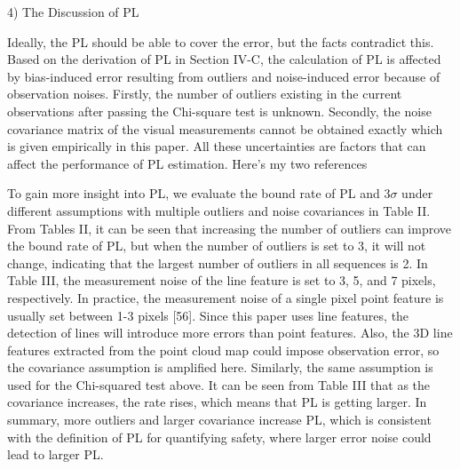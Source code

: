\documentclass[10pt, letterpaper]{article}
\begin{document}
\begin{multicols*}{2}
4) The Discussion of PL


Ideally, the PL should be able to cover the error, but the facts
contradict this. Based on the derivation of PL in Section IV-C,
the calculation of PL is affected by bias-induced error resulting
from outliers and noise-induced error because of observation
noises. Firstly, the number of outliers existing in the current
observations after passing the Chi-square test is unknown.
Secondly, the noise covariance matrix of the visual
measurements cannot be obtained exactly which is given
empirically in this paper. All these uncertainties are factors that
can affect the performance of PL estimation.
\color{blue}Here's my two references \cite{pouliot2009linescout}\cite{zelazo2012rigidity}\color{black}

To gain more insight into PL, we evaluate the bound rate of
PL and 3$\sigma$ under different assumptions with multiple outliers
and noise covariances in Table II. From Tables II, it can be seen
that increasing the number of outliers can improve the bound
rate of PL, but when the number of outliers is set to 3, it will
not change, indicating that the largest number of outliers in all
sequences is 2. In Table III, the measurement noise of the line
feature is set to 3, 5, and 7 pixels, respectively. In practice, the
measurement noise of a single pixel point feature is usually set
between 1-3 pixels [56]. Since this paper uses line features, the
detection of lines will introduce more errors than point features.
Also, the 3D line features extracted from the point cloud map
could impose observation error, so the covariance assumption
is amplified here. Similarly, the same assumption is used for the
Chi-squared test above. It can be seen from Table III that as the
covariance increases, the rate rises, which means that PL is
getting larger. In summary, more outliers and larger covariance
increase PL, which is consistent with the definition of PL for
quantifying safety, where larger error noise could lead to larger
PL.


\end{multicols*}
\end{document}
